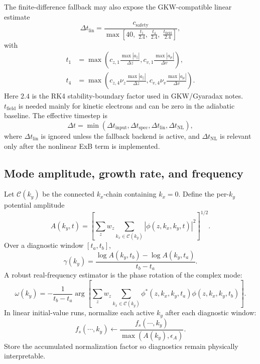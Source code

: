 \documentclass[11pt,a4paper]{article}
\begin{document}
The finite-difference fallback may also expose the GKW-compatible linear estimate
\begin{equation}
  \Delta t_{\mathrm{lin}}
  =
  \frac{c_{\mathrm{safety}}}
  {
    \max\left[
      40,\;
      \frac{t_1}{2.4},\;
      \frac{t_4}{2.4},\;
      \frac{t_{\mathrm{field}}}{2.4}
    \right]
  },
  \label{eq:dtlin}
\end{equation}
with
\begin{align}
  t_1 &=
  \max\left(
    c_{z,1}\frac{\max|a_\parallel|}{\Delta z},
    c_{v,1}\frac{\max|a_\mu|}{\Delta v}
  \right),
  \label{eq:t1}
  \\
  t_4 &=
  \max\left(
    c_{z,4}\nu_z\frac{\max|a_\parallel|}{\Delta z},
    c_{v,4}\nu_v\frac{\max|a_\mu|}{\Delta v}
  \right).
  \label{eq:t4}
\end{align}
Here \(2.4\) is the RK4 stability-boundary factor used in GKW/Gyaradax notes.  \(t_{\mathrm{field}}\) is needed mainly for kinetic electrons and can be zero in the adiabatic baseline.  The effective timestep is
\begin{equation}
  \Delta t
  =
  \min(\Delta t_{\mathrm{input}},\Delta t_{\mathrm{spec}},\Delta t_{\mathrm{lin}},\Delta t_{\mathrm{NL}}),
  \label{eq:dteff}
\end{equation}
where \(\Delta t_{\mathrm{lin}}\) is ignored unless the fallback backend is active, and \(\Delta t_{\mathrm{NL}}\) is relevant only after the nonlinear ExB term is implemented.

\subsection{Mode amplitude, growth rate, and frequency}

Let \(\mathcal{C}(k_y)\) be the connected \(k_x\)-chain containing \(k_x=0\).  Define the per-\(k_y\) potential amplitude
\begin{equation}
  A(k_y,t)
  =
  \left[
    \sum_{z} w_z
    \sum_{k_x\in\mathcal{C}(k_y)}
    |\phi(z,k_x,k_y,t)|^2
  \right]^{1/2}.
  \label{eq:mode-amplitude}
\end{equation}
Over a diagnostic window \([t_a,t_b]\),
\begin{equation}
  \gamma(k_y)
  =
  \frac{\log A(k_y,t_b)-\log A(k_y,t_a)}{t_b-t_a}.
  \label{eq:growth-rate}
\end{equation}
A robust real-frequency estimator is the phase rotation of the complex mode:
\begin{equation}
  \omega(k_y)
  =
  -\frac{1}{t_b-t_a}
  \arg
  \left[
    \sum_z w_z
    \sum_{k_x\in\mathcal{C}(k_y)}
    \phi^*(z,k_x,k_y,t_a)\phi(z,k_x,k_y,t_b)
  \right].
  \label{eq:frequency}
\end{equation}
In linear initial-value runs, normalize each active \(k_y\) after each diagnostic window:
\begin{equation}
  f_s(\cdots,k_y) \leftarrow
  \frac{f_s(\cdots,k_y)}{\max(A(k_y),\epsilon_A)}.
  \label{eq:linear-normalization}
\end{equation}
Store the accumulated normalization factor so diagnostics remain physically interpretable.
\end{document}
